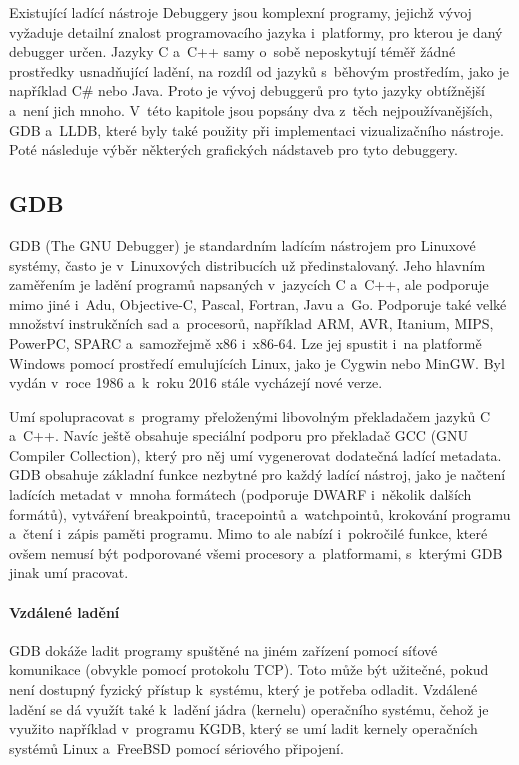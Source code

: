 \documentclass[czech,bachelor,male,python,dept460,hidelinks]{diploma}						%
\newcommand{\parspace}[1][]{
	\ifthenelse{\isempty{#1}}{\vspace{0mm}}{\vspace{#1}}
	\par
}
\begin{document}
\begin{section}{Existující ladící nástroje}
\label{sec:ExistingDebuggers}
	Debuggery jsou komplexní programy, jejichž vývoj vyžaduje detailní znalost programovacího jazyka i~platformy, pro kterou je daný debugger určen.
	Jazyky C a~C++ samy o~sobě neposkytují téměř žádné prostředky usnadňující ladění, na rozdíl od jazyků s~běhovým prostředím, jako je například C\# nebo Java.
	Proto je vývoj debuggerů pro tyto jazyky obtížnější a~není jich mnoho. V~této kapitole jsou popsány dva z~těch nejpoužívanějších,
	GDB a~LLDB, které byly také použity při implementaci vizualizačního nástroje. Poté následuje výběr některých grafických nádstaveb pro tyto debuggery.

	\subsection{GDB}
		GDB (The GNU Debugger) je standardním ladícím nástrojem pro Linuxové systémy, často je v~Linuxových distribucích už předinstalovaný.
		Jeho hlavním zaměřením je ladění programů napsaných v~jazycích C a~C++, ale podporuje mimo jiné i~Adu, Objective-C, Pascal, Fortran, Javu
		a~Go. \cite{gdb-languages} Podporuje také velké množství instrukčních sad a~procesorů, například ARM, AVR, Itanium, MIPS, PowerPC, SPARC
		a~samozřejmě x86 i~x86-64. Lze jej spustit i~na platformě Windows pomocí prostředí emulujících Linux, jako je Cygwin nebo MinGW.
		Byl vydán v~roce 1986 a~k~roku 2016 stále vycházejí nové verze.
		
		\parspace Umí spolupracovat s~programy přeloženými libovolným překladačem jazyků C a~C++. Navíc ještě obsahuje
		speciální podporu pro překladač GCC (GNU Compiler Collection), který pro něj umí vygenerovat dodatečná ladící metadata.
		GDB obsahuje základní funkce nezbytné pro každý ladící nástroj, jako je načtení ladících metadat v~mnoha formátech (podporuje DWARF i~několik dalších
		formátů), vytváření breakpointů, tracepointů a~watchpointů, krokování programu a~čtení i~zápis paměti programu.
		Mimo to ale nabízí i~pokročilé funkce, které ovšem nemusí být podporované všemi procesory a~platformami, s~kterými GDB jinak umí pracovat.
		
		\paragraph*{Vzdálené ladění}
			GDB dokáže ladit programy spuštěné na jiném zařízení pomocí síťové komunikace (obvykle pomocí protokolu TCP).
			Toto může být užitečné, pokud není dostupný fyzický přístup k~systému, který je potřeba odladit.
			Vzdálené ladění se dá využít také k~ladění jádra (kernelu) operačního systému, čehož je využito například v~programu KGDB, který se umí ladit
			kernely operačních systémů Linux a~FreeBSD pomocí sériového připojení.

\end{section}
\end{document}
